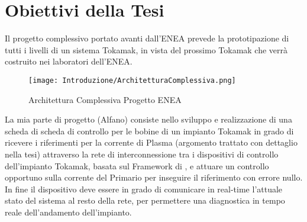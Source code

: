 \section*{Obiettivi della Tesi}
Il progetto complessivo portato avanti dall'ENEA prevede la prototipazione di tutti i livelli di un sistema Tokamak, in vista del prossimo Tokamak che verrà costruito nei laboratori dell'ENEA.\vspace{-4mm}
\begin{figure}[H]
	\centering
	\caption[Architettura Complessiva Progetto ENEA]{Architettura Complessiva Progetto ENEA}
	\texttt{[image: Introduzione/ArchitetturaComplessiva.png]}
\end{figure}\vspace{-8mm}
\noindent
La mia parte di progetto ({\color{red}Alfano})  consiste nello sviluppo e realizzazione di una scheda di scheda di controllo per le bobine di un impianto Tokamak in grado di ricevere i riferimenti per la corrente di Plasma (argomento trattato con dettaglio nella tesi) attraverso la rete di interconnessione tra i dispositivi di controllo dell'impianto Tokamak, basata sul Framework di \MARTe, e attuare un controllo opportuno sulla corrente del Primario per inseguire il riferimento con errore nullo.\\
In fine il dispositivo deve essere in grado di comunicare in real-time l'attuale stato del sistema al resto della rete, per permettere una diagnostica in tempo reale dell'andamento dell'impianto.\\
